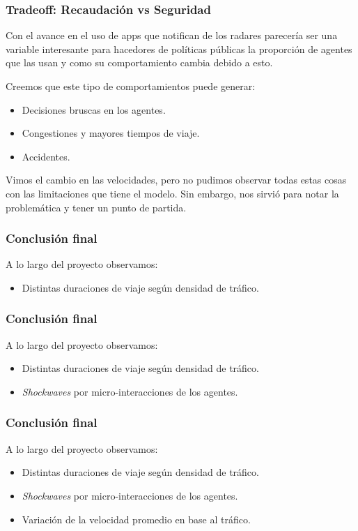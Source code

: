 \documentclass[10pt, compress]{beamer}
\begin{document}
\begin{frame}[fragile]
\frametitle{Tradeoff: Recaudaci\'on vs Seguridad}
Con el avance en el uso de apps que notifican de los radares parecer\'ia ser una variable interesante para hacedores de pol\'iticas p\'ublicas la proporci\'on de agentes que las usan y como su comportamiento cambia debido a esto.

Creemos que este tipo de comportamientos puede generar:

\begin{itemize}
\item Decisiones bruscas en los agentes.
\item Congestiones y mayores tiempos de viaje.
\item Accidentes.
\end{itemize}

Vimos el cambio en las velocidades, pero no pudimos observar todas estas cosas con las limitaciones que tiene el modelo. Sin embargo, nos sirvi\'o para notar la problem\'atica y tener un punto de partida.
\addtocounter{framenumber}{-1}
\end{frame}

\begin{frame}[fragile]
\frametitle{Conclusi\'on final}

A lo largo del proyecto observamos:
\begin{itemize}
\item Distintas duraciones de viaje seg\'un densidad de tr\'afico.
\end{itemize}
\end{frame}

\begin{frame}[fragile]
\frametitle{Conclusi\'on final}

A lo largo del proyecto observamos:
\begin{itemize}
\item Distintas duraciones de viaje seg\'un densidad de tr\'afico.
\item \textit{Shockwaves} por micro-interacciones de los agentes.
\end{itemize}
\addtocounter{framenumber}{-1}
\end{frame}

\begin{frame}[fragile]
\frametitle{Conclusi\'on final}

A lo largo del proyecto observamos:
\begin{itemize}
\item Distintas duraciones de viaje seg\'un densidad de tr\'afico.
\item \textit{Shockwaves} por micro-interacciones de los agentes.
\item Variaci\'on de la velocidad promedio en base al tr\'afico.
\end{itemize}
\addtocounter{framenumber}{-1}
\end{frame}
\end{document}
